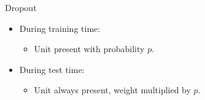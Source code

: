 \begin{frame}{Dropout}
\begin{itemize}
	\item During training time:
	\begin{itemize}
		\item Unit present with probability $p$.
	\end{itemize}
	\item During test time:
	\begin{itemize}
		\item Unit always present, weight multiplied by $p$.
	\end{itemize}
\end{itemize}
\end{frame}



